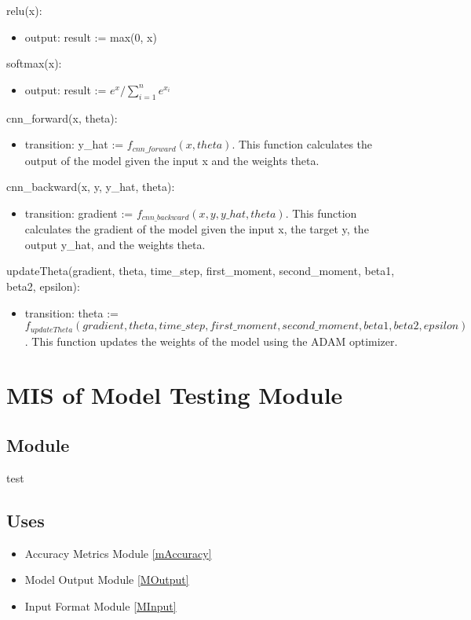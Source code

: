 \documentclass[12pt, titlepage]{article}
\begin{document}
\noindent relu(x):
\begin{itemize}
\item output: result := max(0, x)
\end{itemize}

\noindent softmax(x):
\begin{itemize}
\item output: result := $e^{x} / \sum_{i=1}^{n} e^{x_i}$
\end{itemize}

\noindent cnn\_forward(x, theta):
\begin{itemize}
\item transition: y\_hat := $f_{cnn\_forward}(x, theta)$. This function
calculates the output of the model given the input x and the weights theta.
\end{itemize}

\noindent cnn\_backward(x, y, y\_hat, theta):
\begin{itemize}
\item transition: gradient := $f_{cnn\_backward}(x, y, y\_hat, theta)$. This
function calculates the gradient of the model given the input x, the target y,
the output y\_hat, and the weights theta.
\end{itemize}

\noindent updateTheta(gradient, theta, time\_step, first\_moment, second\_moment, beta1, beta2, epsilon):
\begin{itemize}
\item transition: theta := $f_{updateTheta}(gradient, theta, time\_step, first\_moment, second\_moment, beta1, beta2, epsilon)$. This function updates the weights of the model using the ADAM optimizer.
\end{itemize}


\section{MIS of Model Testing Module} \label{MTesting}

\subsection{Module}

test

\subsection{Uses}

\begin{itemize}
  \item Accuracy Metrics Module \ref{mAccuracy}
  \item Model Output Module \ref{MOutput}
  \item Input Format Module \ref{MInput}
\end{itemize}
\end{document}
